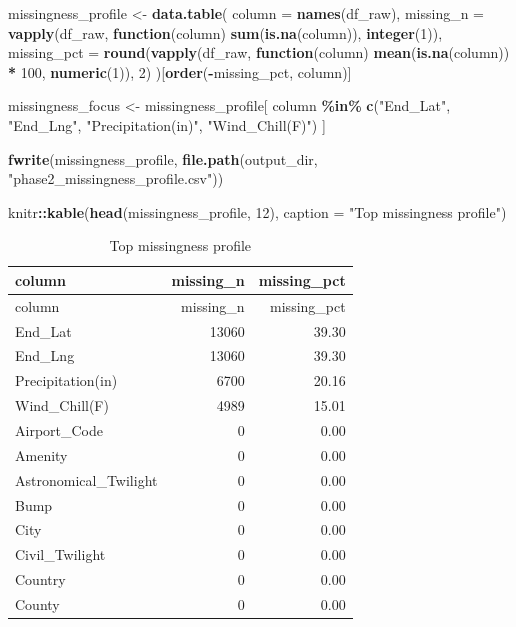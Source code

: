 \documentclass[
]{article}
\newenvironment{Shaded}{\begin{snugshade}}{\end{snugshade}}
\newcommand{\AttributeTok}[1]{\textcolor[rgb]{0.13,0.29,0.53}{#1}}
\newcommand{\ControlFlowTok}[1]{\textcolor[rgb]{0.13,0.29,0.53}{\textbf{#1}}}
\newcommand{\DecValTok}[1]{\textcolor[rgb]{0.00,0.00,0.81}{#1}}
\newcommand{\FunctionTok}[1]{\textcolor[rgb]{0.13,0.29,0.53}{\textbf{#1}}}
\newcommand{\NormalTok}[1]{#1}
\newcommand{\OtherTok}[1]{\textcolor[rgb]{0.56,0.35,0.01}{#1}}
\newcommand{\SpecialCharTok}[1]{\textcolor[rgb]{0.81,0.36,0.00}{\textbf{#1}}}
\newcommand{\StringTok}[1]{\textcolor[rgb]{0.31,0.60,0.02}{#1}}
\begin{document}
\begin{Shaded}
\begin{Highlighting}[]
\NormalTok{missingness\_profile }\OtherTok{\textless{}{-}} \FunctionTok{data.table}\NormalTok{(}
  \AttributeTok{column =} \FunctionTok{names}\NormalTok{(df\_raw),}
  \AttributeTok{missing\_n =} \FunctionTok{vapply}\NormalTok{(df\_raw, }\ControlFlowTok{function}\NormalTok{(column) }\FunctionTok{sum}\NormalTok{(}\FunctionTok{is.na}\NormalTok{(column)), }\FunctionTok{integer}\NormalTok{(}\DecValTok{1}\NormalTok{)),}
  \AttributeTok{missing\_pct =} \FunctionTok{round}\NormalTok{(}\FunctionTok{vapply}\NormalTok{(df\_raw, }\ControlFlowTok{function}\NormalTok{(column) }\FunctionTok{mean}\NormalTok{(}\FunctionTok{is.na}\NormalTok{(column)) }\SpecialCharTok{*} \DecValTok{100}\NormalTok{, }\FunctionTok{numeric}\NormalTok{(}\DecValTok{1}\NormalTok{)), }\DecValTok{2}\NormalTok{)}
\NormalTok{)[}\FunctionTok{order}\NormalTok{(}\SpecialCharTok{{-}}\NormalTok{missing\_pct, column)]}

\NormalTok{missingness\_focus }\OtherTok{\textless{}{-}}\NormalTok{ missingness\_profile[}
\NormalTok{  column }\SpecialCharTok{\%in\%} \FunctionTok{c}\NormalTok{(}\StringTok{"End\_Lat"}\NormalTok{, }\StringTok{"End\_Lng"}\NormalTok{, }\StringTok{"Precipitation(in)"}\NormalTok{, }\StringTok{"Wind\_Chill(F)"}\NormalTok{)}
\NormalTok{]}

\FunctionTok{fwrite}\NormalTok{(missingness\_profile, }\FunctionTok{file.path}\NormalTok{(output\_dir, }\StringTok{"phase2\_missingness\_profile.csv"}\NormalTok{))}

\NormalTok{knitr}\SpecialCharTok{::}\FunctionTok{kable}\NormalTok{(}\FunctionTok{head}\NormalTok{(missingness\_profile, }\DecValTok{12}\NormalTok{), }\AttributeTok{caption =} \StringTok{"Top missingness profile"}\NormalTok{)}
\end{Highlighting}
\end{Shaded}

\begin{longtable}[]{@{}lrr@{}}
\caption{Top missingness profile}\tabularnewline
\toprule\noalign{}
column & missing\_n & missing\_pct \\
\midrule\noalign{}
\endfirsthead
\toprule\noalign{}
column & missing\_n & missing\_pct \\
\midrule\noalign{}
\endhead
\bottomrule\noalign{}
\endlastfoot
End\_Lat & 13060 & 39.30 \\
End\_Lng & 13060 & 39.30 \\
Precipitation(in) & 6700 & 20.16 \\
Wind\_Chill(F) & 4989 & 15.01 \\
Airport\_Code & 0 & 0.00 \\
Amenity & 0 & 0.00 \\
Astronomical\_Twilight & 0 & 0.00 \\
Bump & 0 & 0.00 \\
City & 0 & 0.00 \\
Civil\_Twilight & 0 & 0.00 \\
Country & 0 & 0.00 \\
County & 0 & 0.00 \\
\end{longtable}
\end{document}
